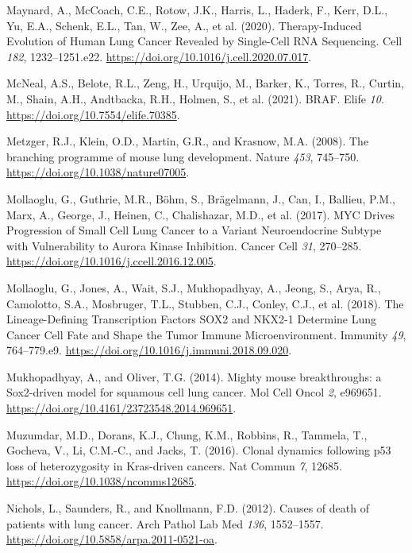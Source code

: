 \begin{CSLReferences}{0}{0}
\leavevmode{}%
Maynard, A., McCoach, C.E., Rotow, J.K., Harris, L., Haderk, F., Kerr, D.L., Yu, E.A., Schenk, E.L., Tan, W., Zee, A., et al. (2020). Therapy-Induced Evolution of Human Lung Cancer Revealed by Single-Cell RNA Sequencing. Cell \emph{182}, 1232--1251.e22. \url{https://doi.org/10.1016/j.cell.2020.07.017}.

\leavevmode{}%
McNeal, A.S., Belote, R.L., Zeng, H., Urquijo, M., Barker, K., Torres, R., Curtin, M., Shain, A.H., Andtbacka, R.H., Holmen, S., et al. (2021). BRAF. Elife \emph{10}. \url{https://doi.org/10.7554/elife.70385}.

\leavevmode{}%
Metzger, R.J., Klein, O.D., Martin, G.R., and Krasnow, M.A. (2008). The branching programme of mouse lung development. Nature \emph{453}, 745--750. \url{https://doi.org/10.1038/nature07005}.

\leavevmode{}%
Mollaoglu, G., Guthrie, M.R., Böhm, S., Brägelmann, J., Can, I., Ballieu, P.M., Marx, A., George, J., Heinen, C., Chalishazar, M.D., et al. (2017). MYC Drives Progression of Small Cell Lung Cancer to a Variant Neuroendocrine Subtype with Vulnerability to Aurora Kinase Inhibition. Cancer Cell \emph{31}, 270--285. \url{https://doi.org/10.1016/j.ccell.2016.12.005}.

\leavevmode{}%
Mollaoglu, G., Jones, A., Wait, S.J., Mukhopadhyay, A., Jeong, S., Arya, R., Camolotto, S.A., Mosbruger, T.L., Stubben, C.J., Conley, C.J., et al. (2018). The Lineage-Defining Transcription Factors SOX2 and NKX2-1 Determine Lung Cancer Cell Fate and Shape the Tumor Immune Microenvironment. Immunity \emph{49}, 764--779.e9. \url{https://doi.org/10.1016/j.immuni.2018.09.020}.

\leavevmode{}%
Mukhopadhyay, A., and Oliver, T.G. (2014). Mighty mouse breakthroughs: a Sox2-driven model for squamous cell lung cancer. Mol Cell Oncol \emph{2}, e969651. \url{https://doi.org/10.4161/23723548.2014.969651}.

\leavevmode{}%
Muzumdar, M.D., Dorans, K.J., Chung, K.M., Robbins, R., Tammela, T., Gocheva, V., Li, C.M.-C., and Jacks, T. (2016). Clonal dynamics following p53 loss of heterozygosity in Kras-driven cancers. Nat Commun \emph{7}, 12685. \url{https://doi.org/10.1038/ncomms12685}.

\leavevmode{}%
Nichols, L., Saunders, R., and Knollmann, F.D. (2012). Causes of death of patients with lung cancer. Arch Pathol Lab Med \emph{136}, 1552--1557. \url{https://doi.org/10.5858/arpa.2011-0521-oa}.


\end{CSLReferences}
